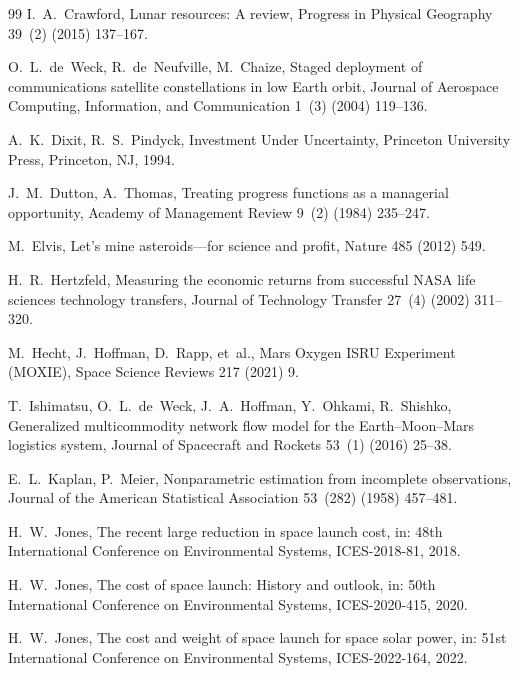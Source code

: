 \documentclass[preprint,12pt]{elsarticle}
\begin{document}
\begin{thebibliography}{99}
I.~A.~Crawford,
\newblock Lunar resources: A review,
\newblock Progress in Physical Geography 39~(2) (2015) 137--167.

O.~L.~de~Weck, R.~de~Neufville, M.~Chaize,
\newblock Staged deployment of communications satellite constellations in low Earth orbit,
\newblock Journal of Aerospace Computing, Information, and Communication 1~(3) (2004) 119--136.

A.~K.~Dixit, R.~S.~Pindyck,
\newblock Investment Under Uncertainty,
\newblock Princeton University Press, Princeton, NJ, 1994.

J.~M.~Dutton, A.~Thomas,
\newblock Treating progress functions as a managerial opportunity,
\newblock Academy of Management Review 9~(2) (1984) 235--247.

M.~Elvis,
\newblock Let's mine asteroids---for science and profit,
\newblock Nature 485 (2012) 549.

H.~R.~Hertzfeld,
\newblock Measuring the economic returns from successful NASA life sciences technology transfers,
\newblock Journal of Technology Transfer 27~(4) (2002) 311--320.

M.~Hecht, J.~Hoffman, D.~Rapp, et~al.,
\newblock Mars Oxygen ISRU Experiment (MOXIE),
\newblock Space Science Reviews 217 (2021) 9.

T.~Ishimatsu, O.~L.~de~Weck, J.~A.~Hoffman, Y.~Ohkami, R.~Shishko,
\newblock Generalized multicommodity network flow model for the Earth--Moon--Mars logistics system,
\newblock Journal of Spacecraft and Rockets 53~(1) (2016) 25--38.

E.~L.~Kaplan, P.~Meier,
\newblock Nonparametric estimation from incomplete observations,
\newblock Journal of the American Statistical Association 53~(282) (1958) 457--481.

H.~W.~Jones,
\newblock The recent large reduction in space launch cost,
\newblock in: 48th International Conference on Environmental Systems, ICES-2018-81, 2018.

H.~W.~Jones,
\newblock The cost of space launch: History and outlook,
\newblock in: 50th International Conference on Environmental Systems, ICES-2020-415, 2020.

H.~W.~Jones,
\newblock The cost and weight of space launch for space solar power,
\newblock in: 51st International Conference on Environmental Systems, ICES-2022-164, 2022.


\end{thebibliography}
\end{document}
